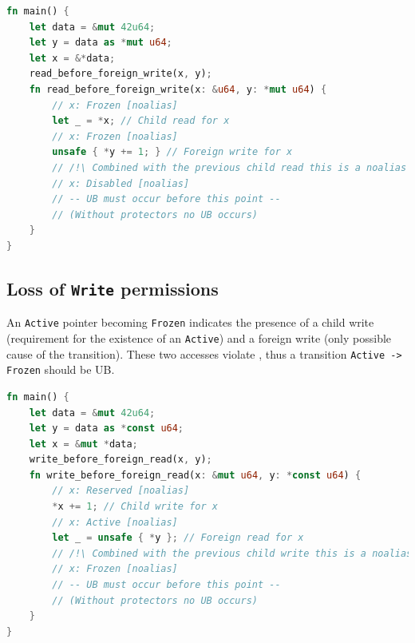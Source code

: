 \documentclass[a4paper,11pt]{article}
\theoremstyle{plain}
\theoremstyle{definition}
\theoremstyle{remark}
\newcommand{\tcode}[1]{\rstinline{#1}}
\newcommand{\tperm}[1]{\texttt{#1}}
\begin{document}
\begin{lstlisting}[language=rust]
fn main() {
    let data = &mut 42u64;
    let y = data as *mut u64;
    let x = &*data;
    read_before_foreign_write(x, y);
    fn read_before_foreign_write(x: &u64, y: *mut u64) {
        // x: Frozen [noalias]
        let _ = *x; // Child read for x
        // x: Frozen [noalias]
        unsafe { *y += 1; } // Foreign write for x
        // /!\ Combined with the previous child read this is a noalias violation
        // x: Disabled [noalias]
        // -- UB must occur before this point --
        // (Without protectors no UB occurs)
    }
}
\end{lstlisting}


\subsection{Loss of \tperm{Write} permissions}

An \tperm{Active} pointer becoming \tperm{Frozen} indicates the presence of a child write
(requirement for the existence of an \tperm{Active}) and a foreign write (only possible cause
of the transition). These two accesses violate \tcode{noalias}, thus a transition \tperm{Active -> Frozen}
should be UB.

\begin{lstlisting}[language=rust]
fn main() {
    let data = &mut 42u64;
    let y = data as *const u64;
    let x = &mut *data;
    write_before_foreign_read(x, y);
    fn write_before_foreign_read(x: &mut u64, y: *const u64) {
        // x: Reserved [noalias]
        *x += 1; // Child write for x
        // x: Active [noalias]
        let _ = unsafe { *y }; // Foreign read for x
        // /!\ Combined with the previous child write this is a noalias violation
        // x: Frozen [noalias]
        // -- UB must occur before this point --
        // (Without protectors no UB occurs)
    }
}
\end{lstlisting}
\end{document}
